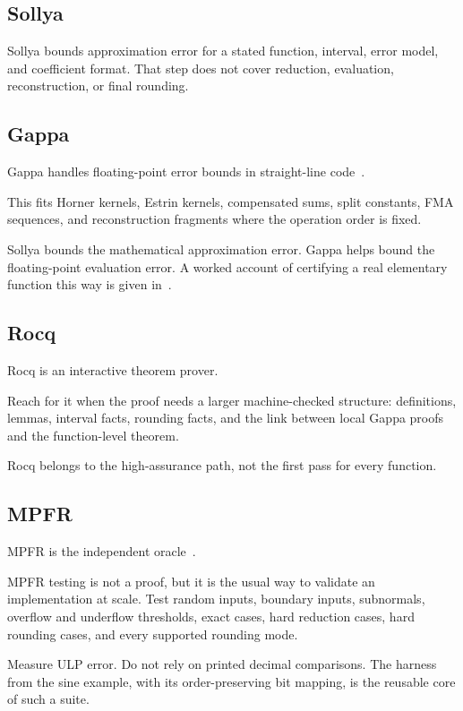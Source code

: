 \documentclass[manuscript, nonacm]{acmart}
\begin{document}
  \subsection{Sollya}

  Sollya bounds approximation error for a stated function, interval, error model,
  and coefficient format. That step does not cover reduction, evaluation,
  reconstruction, or final rounding.

  \subsection{Gappa}

  Gappa handles floating-point error bounds in straight-line
  code~\cite{gappapaper}.

  This fits Horner kernels, Estrin kernels, compensated sums, split constants,
  FMA sequences, and reconstruction fragments where the operation order is
  fixed.

  Sollya bounds the mathematical approximation error. Gappa helps bound the
  floating-point evaluation error. A worked account of certifying a real
  elementary function this way is given in~\cite{gappacert}.

  \subsection{Rocq}

  Rocq is an interactive theorem prover.

  Reach for it when the proof needs a larger machine-checked structure: definitions,
  lemmas, interval facts, rounding facts, and the link between local Gappa
  proofs and the function-level theorem.

  Rocq belongs to the high-assurance path, not the first pass for every
  function.

  \subsection{MPFR}

  MPFR is the independent oracle~\cite{mpfrpaper}.

  MPFR testing is not a proof, but it is the usual way to validate an
  implementation at scale. Test random inputs, boundary inputs, subnormals,
  overflow and underflow thresholds, exact cases, hard reduction cases, hard
  rounding cases, and every supported rounding mode.

  Measure ULP error. Do not rely on printed decimal comparisons. The
  harness from the sine example, with its order-preserving bit mapping, is
  the reusable core of such a suite.
\end{document}
